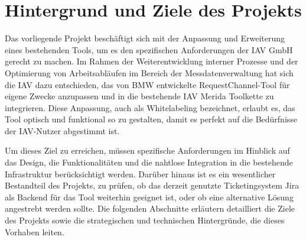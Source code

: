 \chapter{Hintergrund und Ziele des Projekts}
\label{chap:grundlagen}
Das vorliegende Projekt beschäftigt sich mit der Anpassung und Erweiterung eines bestehenden Tools, um es den spezifischen Anforderungen der IAV GmbH gerecht zu machen. Im Rahmen der Weiterentwicklung interner Prozesse und der Optimierung von Arbeitsabläufen im Bereich der Messdatenverwaltung hat sich die IAV dazu entschieden, das von BMW entwickelte RequestChannel-Tool für eigene Zwecke anzupassen und in die bestehende IAV Merida Toolkette zu integrieren. Diese Anpassung, auch als Whitelabeling bezeichnet, erlaubt es, das Tool optisch und funktional so zu gestalten, damit es perfekt auf die Bedürfnisse der IAV-Nutzer abgestimmt ist.

Um dieses Ziel zu erreichen, müssen spezifische Anforderungen im Hinblick auf das Design, die Funktionalitäten und die nahtlose Integration in die bestehende Infrastruktur berücksichtigt werden. Darüber hinaus ist es ein wesentlicher Bestandteil des Projekts, zu prüfen, ob das derzeit genutzte Ticketingsystem Jira als Backend für das Tool weiterhin geeignet ist, oder ob eine alternative Lösung angestrebt werden sollte. Die folgenden Abschnitte erläutern detailliert die Ziele des Projekts sowie die strategischen und technischen Hintergründe, die dieses Vorhaben leiten.
